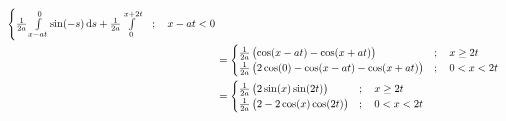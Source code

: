\documentclass[fleqn, a4paper, 11pt, oneside]{amsart}
\theoremstyle{definition}
\theoremstyle{theorem}
\begin{document}
\begin{solution}
\begin{align*}
\begin{cases}
				\frac{1}{2 a} \int\limits_{x - a t}^{0} \sin(-s) \dif s + \frac{1}{2 a} \int\limits_{0}^{x + 2 t} & ;\quad x - a t < 0   \\
			\end{cases}\\
		&=
			\begin{cases}
				\frac{1}{2 a} \left( \cos(x - a t) - \cos(x + a t) \right)             & ;\quad x \ge 2 t   \\
				\frac{1}{2 a} \left( 2 \cos(0) - \cos(x - a t) - \cos(x + a t) \right) & ;\quad 0 < x < 2 t \\
			\end{cases}\\
		&=
			\begin{cases}
				\frac{1}{2 a} \left( 2 \sin(x) \sin(2 t) \right)     & ;\quad x \ge 2 t   \\
				\frac{1}{2 a} \left( 2 - 2 \cos(x) \cos(2 t) \right) & ;\quad 0 < x < 2 t \\
			\end{cases}
	\end{align*}
\end{solution}
\end{document}
